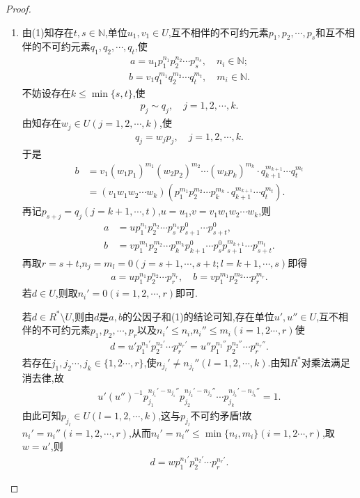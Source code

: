 \documentclass[../../main.tex]{subfiles}%
\begin{document}
\begin{proof}
\begin{enumerate}[(1)]
\item 由(1)知存在$t,s\in \mathbb{N}$,单位$u_1,v_1\in U$,互不相伴的不可约元素$p_1,p_2,\cdots,p_s$和互不相伴的不可约元素$q_1,q_2,\cdots,q_t$,使
\begin{align*}
a=u_1p_{1}^{n_1}p_{2}^{n_2}\cdots p_{s}^{n_s},\quad n_i\in \mathbb{N};
\end{align*}
\begin{align*}
b=v_1q_{1}^{m_1}q_{2}^{m_2}\cdots q_{t}^{m_t},\quad m_i\in \mathbb{N}.
\end{align*}
不妨设存在$k\leqslant \min\{s,t\}$,使
\begin{align*}
p_j\sim q_j,\quad j=1,2,\cdots,k.
\end{align*}
由知存在$w_j\in U(j=1,2,\cdots,k)$,使
\begin{align*}
q_j=w_jp_j,\quad j=1,2,\cdots,k.
\end{align*}
于是
\begin{align*}
b&=v_1(w_1p_1)^{m_1}(w_2p_2)^{m_2}\cdots(w_kp_k)^{m_k}\cdot q_{k+1}^{m_{k+1}}\cdots q_{t}^{m_t} \\
&=(v_1w_1w_2\cdots w_k)\left(p_{1}^{m_1}p_{2}^{m_2}\cdots p_{k}^{m_k}\cdot q_{k+1}^{m_{k+1}}\cdots q_{t}^{m_t}\right).
\end{align*}
再记$p_{s+j}=q_j(j=k+1,\cdots,t)$,$u=u_1$,$v=v_1w_1w_2\cdots w_k$,则
\begin{align*}
a&=up_{1}^{n_1}p_{2}^{n_2}\cdots p_{s}^{n_s}p_{s+1}^{0}\cdots p_{s+t}^{0}, \\
b&=vp_{1}^{m_1}p_{2}^{m_2}\cdots p_{k}^{m_k}p_{k+1}^{0}\cdots p_{s}^{0}p_{s+1}^{m_{k+1}}\cdots p_{s+t}^{m_t}.
\end{align*}
再取$r=s+t$,$n_j=m_l=0(j=s+1,\cdots,s+t;l=k+1,\cdots,s)$即得
\begin{align*}
a=up_{1}^{n_1}p_{2}^{n_2}\cdots p_{r}^{n_r},\quad b=vp_{1}^{m_1}p_{2}^{m_2}\cdots p_{r}^{m_r}.
\end{align*}
若$d\in U$,则取$n_{i}'=0(i=1,2,\cdots,r)$即可.

若$d\in R^*\setminus U$,则由$d$是$a,b$的公因子和(1)的结论可知,存在单位$u',u''\in U$,互不相伴的不可约元素$p_1,p_2,\cdots,p_r$以及$n_{i}'\leqslant n_i$,$n_{i}''\leqslant m_i(i=1,2\cdots,r)$使
\begin{align*}
d=u'p_{1}^{n_{1}'}p_{2}^{n_{2}'}\cdots p_{r}^{n_{r}'}=u''p_{1}^{n_{1}''}p_{2}^{n_{2}''}\cdots p_{r}^{n_{r}''}.
\end{align*}
若存在$j_1,j_2\cdots,j_k\in\{1,2\cdots,r\}$,使$n_{j_l}'\neq n_{j_l}''(l=1,2,\cdots,k)$.由知$R^*$对乘法满足消去律,故
\begin{align*}
u'(u'')^{-1}p_{j_1}^{n_{j_1}'-n_{j_1}''}p_{j_2}^{n_{j_2}'-n_{j_2}''}\cdots p_{j_k}^{n_{j_k}'-n_{j_k}''}=1.
\end{align*}
由此可知$p_{j_l}\in U(l=1,2,\cdots,k)$,这与$p_{j_l}$不可约矛盾!故$n_{i}'=n_{i}''(i=1,2,\cdots,r)$,从而$n_{i}'=n_{i}''\leqslant \min\{n_i,m_i\}(i=1,2\cdots,r)$,取$w=u'$,则
\begin{align*}
d=wp_{1}^{n_{1}'}p_{2}^{n_{2}'}\cdots p_{r}^{n_{r}'}.
\end{align*}


\end{enumerate}
\end{proof}
\end{document}
